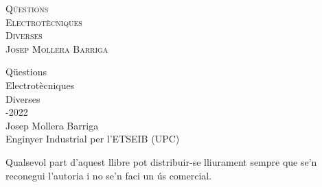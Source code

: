 \pagecolor{colorPortada}


\begin{titlepage}
	\parbox{18cm}{\fontsize{60pt}{60pt}\selectfont\color{red}\scshape%
		Qüestions\\[25pt] Electrotècniques\\[25pt] Diverses\\[80pt]%
		\fontsize{40pt}{40pt}\selectfont{}Josep Mollera Barriga}
	\vspace*{10mm}
	\begin{center}
		\fontsize{10pt}{11pt}\selectfont
		
	\end{center}
\end{titlepage}

\pagecolor{white}

\cleardoublepage\thispagestyle{empty}
{\fontsize{60pt}{60pt}\selectfont%
	Qüestions\\[25pt]
	Electrotècniques\\[25pt]
	Diverses\\[90pt]}
{\fontsize{40pt}{40pt}-2022 \hspace{5mm}{\Huge(versió 13.3)}\\[85pt]
	Josep Mollera Barriga\\[25pt]}
{\fontsize{25pt}{25pt}\selectfont
	Enginyer Industrial per l'ETSEIB (UPC)}
\vfill
{\fontsize{15pt}{20pt}\selectfont
	\begin{list}{}
		{\setlength{\labelwidth}{7mm} \setlength{\leftmargin}{7mm}\setlength{\labelsep}{2mm}}
		\item[\faCopyright]  Qualsevol part d'aquest llibre  pot  distribuir-se lliurament
		sempre que se’n reconegui l’autoria i no se’n faci un ús comercial.
\end{list}}

